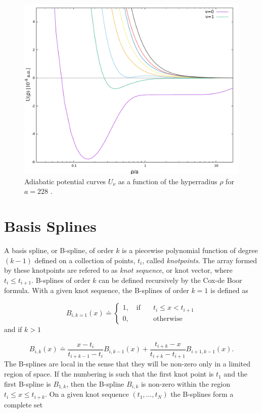 \documentclass{article}
\numberwithin{equation}{section}
\numberwithin{figure}{section}
\begin{document}
\begin{figure}
	\includegraphics[width=\linewidth]{adiabatic.pdf}
	\caption{Adiabatic potential curves $U_{\nu}$ as a function of the hyperradius $\rho$ for $a=228 $ .}
	\label{fig:3}
\end{figure}

\appendix
\section{Basis Splines}\label{B-splines}
A basis spline, or B-spline, of order $k$ is a piecewise polynomial function of degree $(k-1)$ defined on a collection of points, $t_i$, called \textit{knotpoints}. The array formed by these knotpoints are refered to as \textit{knot sequence}, or knot vector, where $t_i\leq t_{i+1}$. B-splines of order $k$ can be defined recursively by the Cox-de Boor formula. With a given knot sequence, the B-splines of order $k=1$ is defined as

\begin{equation}
B_{i,k=1}(x) \doteq
\begin{cases}
1, \quad \text{if} \quad & t_i \leq x < t_{i+1}\\
0,& \text{otherwise} 
\end{cases}
\end{equation}
and if $k>1$

\begin{equation}
B_{i,k}(x) \doteq \frac{x-t_i}{t_{i+k-1}-t_i}B_{i,k-1}(x) + \frac{t_{i+k}-x}{t_{i+k}-t_{i+1}}B_{i+1,k-1}(x).
\end{equation}
The B-splines are local in the sense that they will be non-zero only in a limited region of space. If the numbering is such that the first knot point is $t_1$ and the first  B-spline is $B_{1,k}$, then the B-spline $B_{i,k}$ is non-zero within the region $t_i \leq x \leq t_{i+k}$. On a given knot sequence $(t_1,\ldots , t_N)$ the B-splines form a complete set
\end{document}
